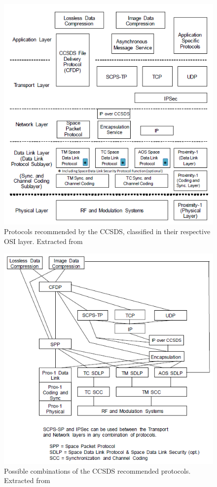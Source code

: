 \begin{figure}[H]
\begin{center}
\includegraphics[scale=0.6]{SpaceSegment/Layer3/CCSDSprotocols.png}
\caption{Protocols recommended by the CCSDS, classified in their respective OSI layer. Extracted from \cite{CCSDSOverview}}
\end{center}
\end{figure}
\begin{figure}[H]
\begin{center}
\includegraphics[scale=0.6]{SpaceSegment/Layer3/CCSDScombinations.png}
\caption{Possible combinations of the CCSDS recommended protocols. Extracted from \cite{CCSDSOverview}}
\end{center}
\end{figure}

